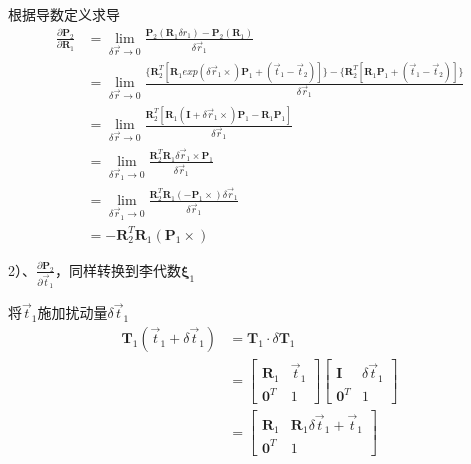 \documentclass{article}
\begin{document}
根据导数定义求导
\begin{equation}
	\begin{aligned}
		\frac{\partial{\boldsymbol{P}_2}}{\partial{\boldsymbol{R}_1}} & = 
		\lim_{\delta \vec{r}\rightarrow0}
		\frac{\boldsymbol{P}_2(\boldsymbol{R}_1\delta r_1)- \boldsymbol{P}_2(\boldsymbol{R}_1)}
		{\delta \vec{r}_1}
		\\&=
		\lim_{\delta \vec{r}\rightarrow0}
		\frac{\{\boldsymbol{R}_2^{T} [\boldsymbol{R}_1exp(\delta \vec{r}_1\times)\boldsymbol{P}_1 +(\vec{t}_1-\vec{t}_2)]\}-
		\{\boldsymbol{R}_2^{T}[ \boldsymbol{R}_1\boldsymbol{P}_1 +(\vec{t}_1-\vec{t}_2)]\}}
		{\delta \vec{r}_1}\\&=
		\lim_{\delta \vec{r}\rightarrow0}
		\frac{\boldsymbol{R}_2^{T}[\boldsymbol{R}_1( \boldsymbol{I}+\delta \vec{r}_1\times)\boldsymbol{P}_1 -\boldsymbol{R}_1\boldsymbol{P}_1]}
		{\delta \vec{r} _1}\\&=
		\lim_{\delta \vec{r}_1\rightarrow0}
		\frac{\boldsymbol{R}_2^{T} \boldsymbol{R}_1\delta \vec{r}_1\times\boldsymbol{P}_1}
		{\delta \vec{r}_1}\\&=
		\lim_{\delta \vec{r}_1\rightarrow0}
		\frac{\boldsymbol{R}_2^{T} \boldsymbol{R}_1(-\boldsymbol{P}_1\times)\delta \vec{r}_1}
		{\delta \vec{r}_1}\\&=
		-\boldsymbol{R}_2^{T} \boldsymbol{R}_1(\boldsymbol{P}_1\times)
	\end{aligned}
\end{equation}

2）、$\frac{\partial{\boldsymbol{P}_2}}{\partial{\vec{t}_1}}$，同样转换到李代数$\boldsymbol \xi_1$

将$\vec{t}_1$施加扰动量$\delta \vec{t}_1$
\begin{equation}
	\begin{aligned}
		\boldsymbol{T}_1(\vec{t}_1+\delta \vec{t}_1) & =\boldsymbol{T}_1 \cdot \delta \boldsymbol{T}_1 \\&=
		\left[ 
		\begin{matrix}  
		\boldsymbol{R}_1                             & \vec{t}_1                                       \\
		\boldsymbol{0}^T                             & 1                                               
		\end{matrix}
		\right]
		\left[ 
		\begin{matrix}
		\boldsymbol{I}                               & \delta \vec{t}_1                                \\ 
		\boldsymbol{0}^T                             & 1                                               
		\end{matrix}
		\right]\\&=
		\left[ 
		\begin{matrix} 
		\boldsymbol{R}_1                             & \boldsymbol{R}_1\delta \vec{t}_1+\vec{t}_1      \\ 
		\boldsymbol{0}^T                             & 1                                               
		\end{matrix}
		\right]
	\end{aligned}
\end{equation}
\end{document}
